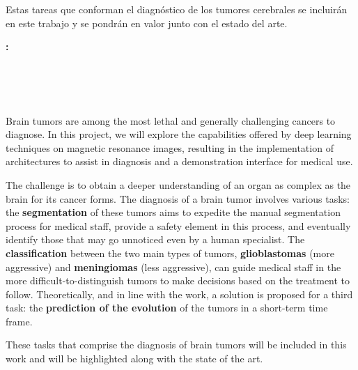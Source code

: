 Estas tareas que conforman el diagnóstico de los tumores cerebrales se incluirán en este trabajo y se pondrán en valor junto con el estado del arte.

\cleardoublepage
\thispagestyle{empty}

\begin{center}
	\large\bfseries \myTitleENGLISH: \mySubTitleENGLISH \\
\end{center}
\begin{center}
	\myName \\
\end{center}

\\

\vspace{0.7cm}
\\

Brain tumors are among the most lethal and generally challenging cancers to diagnose. In this project, we will explore the capabilities offered by deep learning techniques on magnetic resonance images, resulting in the implementation of architectures to assist in diagnosis and a demonstration interface for medical use.

The challenge is to obtain a deeper understanding of an organ as complex as the brain for its cancer forms. The diagnosis of a brain tumor involves various tasks: the \textbf{segmentation} of these tumors aims to expedite the manual segmentation process for medical staff, provide a safety element in this process, and eventually identify those that may go unnoticed even by a human specialist. The \textbf{classification} between the two main types of tumors, \textbf{glioblastomas} (more aggressive) and \textbf{meningiomas} (less aggressive), can guide medical staff in the more difficult-to-distinguish tumors to make decisions based on the treatment to follow. Theoretically, and in line with the work, a solution is proposed for a third task: the \textbf{prediction of the evolution} of the tumors in a short-term time frame.

These tasks that comprise the diagnosis of brain tumors will be included in this work and will be highlighted along with the state of the art.


